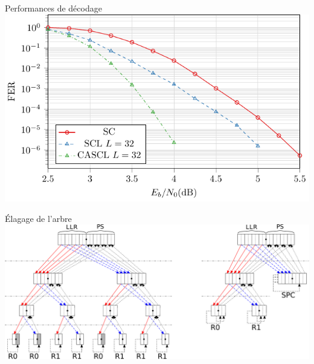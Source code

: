 \begin{frame}[c]{Performances de décodage}
			\includegraphics[width=\textwidth]{./fig/scl_L/tikz/source}
\end{frame}

\begin{frame}[c]{\'Elagage de l'arbre}
			\includegraphics[width=\textwidth]{./fig/pruning}
\end{frame}
	
